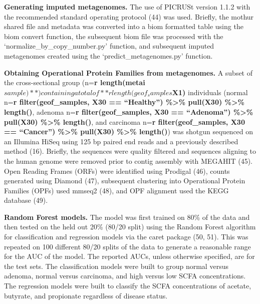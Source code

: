 \documentclass[11pt,]{article}
\begin{document}
\textbf{Generating imputed metagenomes.} The use of PICRUSt version
1.1.2 with the recommended standard operating protocol (44) was used.
Briefly, the mothur shared file and metadata was converted into a biom
formatted table using the biom convert function, the subsequent biom
file was processed with the `normalize\_by\_copy\_number.py' function,
and subsequent imputed metagenomes created using the
`predict\_metagenomes.py' function.

\textbf{Obtaining Operational Protein Families from metagenomes.} A
subset of the cross-sectional group (n=\textbf{r
length(metai\(sample)**) containing a total of **r length(geof_samples\)X1)}
individuals (normal n=\textbf{r filter(geof\_samples, X30 ==
``Healthy'') \%\textgreater{}\% pull(X30) \%\textgreater{}\% length()},
adenoma n=\textbf{r filter(geof\_samples, X30 == ``Adenoma'')
\%\textgreater{}\% pull(X30) \%\textgreater{}\% length()}, and carcinoma
n=\textbf{r filter(geof\_samples, X30 == ``Cancer'') \%\textgreater{}\%
pull(X30) \%\textgreater{}\% length()}) was shotgun sequenced on an
Illumina HiSeq using 125 bp paired end reads and a previously described
method (16). Briefly, the sequences were quality filtered and sequences
aligning to the human genome were removed prior to contig assembly with
MEGAHIT (45). Open Reading Frames (ORFs) were identified using Prodigal
(46), counts generated using Diamond (47), subsequent clustering into
Operational Protein Families (OPFs) used mmseq2 (48), and OPF alignment
used the KEGG database (49).

\textbf{Random Forest models.} The model was first trained on 80\% of
the data and then tested on the held out 20\% (80/20 split) using the
Random Forest algorithm for classification and regression models via the
caret package (50, 51). This was repeated on 100 different 80/20 splits
of the data to generate a reasonable range for the AUC of the model. The
reported AUCs, unless otherwise specified, are for the test sets. The
classification models were built to group normal versus adenoma, normal
versus carcinoma, and high versus low SCFA concentrations. The
regression models were built to classify the SCFA concentrations of
acetate, butyrate, and propionate regardless of disease status.
\end{document}
